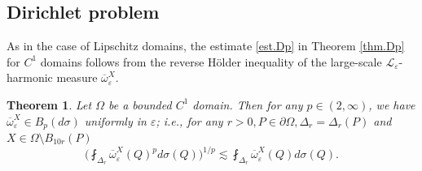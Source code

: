 \documentclass[reqno,12pt]{amsart} %
\newtheorem{theorem}{Theorem}[section]
\theoremstyle{definition}
\theoremstyle{remark}
\numberwithin{equation}{section}
\newcommand{\cL}{\mathcal{L}}
\newcommand{\e}{\varepsilon}
\begin{document}
\subsection{Dirichlet problem}
As in the case of Lipschitz domains, the estimate \eqref{est.Dp} in Theorem \ref{thm.Dp} for $C^1$ domains follows from the reverse H\"{o}lder inequality of the large-scale $\cL_\e$-harmonic measure $\overline{\omega}_\e^X$.
\begin{theorem}\label{thm.C1reverse}
    Let $\Omega$ be a bounded $C^1$ domain. Then for any $p\in (2,\infty)$, we have $\overline{\omega}_\e^X \in B_p(d\sigma)$ uniformly in $\e$;  i.e., for any $r>0, P\in \partial \Omega, \Delta_r = \Delta_r(P)$ and $X\in \Omega\setminus B_{10r}(P)$
    \begin{equation}
        \bigg( \fint_{\Delta_r} \overline{\omega}_\e^X(Q)^p d\sigma(Q) \bigg)^{1/p} \lesssim \fint_{\Delta_{r}} \overline{\omega}_\e^X(Q) d\sigma(Q).
    \end{equation}
\end{theorem}
\end{document}
